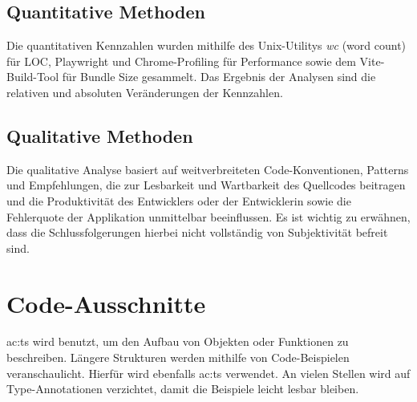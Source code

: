 \subsection{Quantitative Methoden}
Die quantitativen Kennzahlen wurden mithilfe des Unix-Utilitys \textit{wc} (word count) für LOC, Playwright und Chrome-Profiling für Performance sowie dem Vite-Build-Tool für Bundle Size gesammelt. Das Ergebnis der Analysen sind die relativen und absoluten Veränderungen der Kennzahlen.

\subsection{Qualitative Methoden}
Die qualitative Analyse basiert auf weitverbreiteten Code-Konventionen, Patterns und Empfehlungen, die zur Lesbarkeit und Wartbarkeit des Quellcodes beitragen und die Produktivität des Entwicklers oder der Entwicklerin sowie die Fehlerquote der Applikation unmittelbar beeinflussen. Es ist wichtig zu erwähnen, dass die Schlussfolgerungen hierbei nicht vollständig von Subjektivität befreit sind.

\section{Code-Ausschnitte}

\acrlong{ac:ts} wird benutzt, um den Aufbau von Objekten oder Funktionen zu beschreiben. Längere Strukturen werden mithilfe von Code-Beispielen veranschaulicht. Hierfür wird ebenfalls \acrlong{ac:ts} verwendet. An vielen Stellen wird auf Type-Annotationen verzichtet, damit die Beispiele leicht lesbar bleiben.
